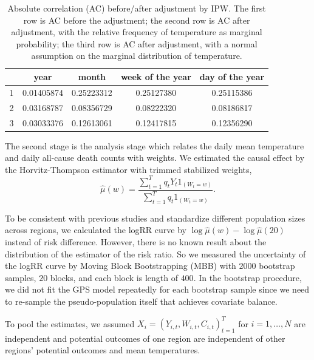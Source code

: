 \documentclass[12pt]{article}
\begin{document}
\begin{table}[ht]
	\centering
\begin{tabular}{|| c || c | c | c | c || }
	\hline\hline
	\ & year & month & week of the year & day of the year \\
	\hline
	1 & 0.01405874 & 0.25223312 & 0.25127380 & 0.25115386 \\ %
	\hline
	2 & 0.03168787 & 0.08356729 & 0.08222320 & 0.08186817 \\ %
	\hline
	3 & 0.03033376 & 0.12613061 & 0.12417815 & 0.12356290 \\ %
	\hline\hline
	
\end{tabular}
\caption{
	Absolute correlation (AC) before/after adjustment by IPW.
	The first row is AC before the adjustment;
	the second row is AC after adjustment, 
	with the relative frequency of temperature as marginal probability;
	the third row is AC after adjustment, 
	with a normal assumption on the marginal distribution of temperature.}
\label{table:AC}
\end{table}

The second stage is the analysis stage which relates
the daily mean temperature and daily all-cause death counts with weights.
We estimated the causal effect by the Horvitz-Thompson estimator with trimmed stabilized weights,
\begin{equation}
	\hat{\mu}(w) = \frac{\sum_{t = 1}^T q_t Y_t 1_{(W_t = w)}}{\sum_{t = 1}^T q_t 1_{(W_t = w)}}.
	\label{eqn:rcmlogrr}
\end{equation}

To be consistent with previous studies and standardize different population sizes across regions,
we calculated the logRR curve by $\log\hat{\mu}(w) - \log \hat{\mu}(20)$ instead of risk difference.
However, there is no known result about the distribution of the estimator of the risk ratio.
So we measured the uncertainty of the logRR curve by Moving Block Bootstrapping (MBB)\cite{mbb1989}
with $2000$ bootstrap samples, $20$ blocks, and each block is length of $400$.
In the bootstrap procedure, we did not fit the GPS model repeatedly for each bootstrap sample
since we need to re-sample the pseudo-population itself that achieves covariate balance.

To pool the estimates,
we assumed $X_i = (Y_{i,t}, W_{i,t}, C_{i,t})_{t = 1}^T$ for $i = 1, \dots, N$ are independent
and potential outcomes of one region are independent 
of other regions' potential outcomes and mean temperatures.
\end{document}
